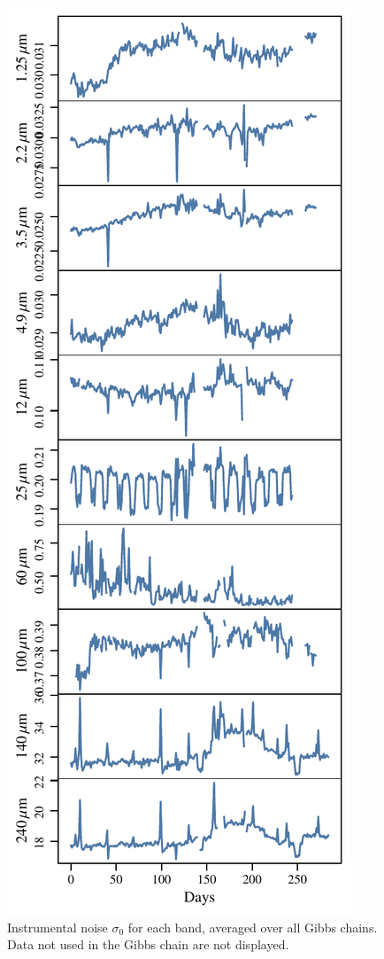 \documentclass{aa}
\begin{document}
\begin{figure}
	\centering
	\includegraphics[width=\columnwidth]{figs/sigma0_bands.pdf}
	\caption{Instrumental noise $\sigma_0$ for each band, averaged over all Gibbs chains. Data not used in the Gibbs chain are not displayed.}
	\label{fig:sigma0}
\end{figure}
\end{document}
